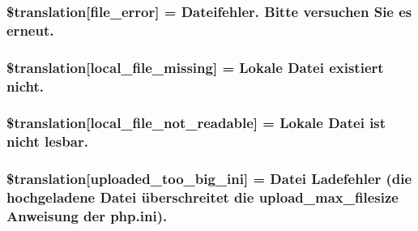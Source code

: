 \subsubsection[{\$translation}]{\setlength{\rightskip}{0pt plus 5cm}\$translation\mbox{[}\textquotesingle{}file\+\_\+error\textquotesingle{}\mbox{]} = \textquotesingle{}Dateifehler. Bitte versuchen Sie es erneut.\textquotesingle{}}\label{class_8upload_8de___d_e_8php_ac7498e49b9771b04698029aa61c70821}
\hypertarget{class_8upload_8de___d_e_8php_a6ec3d3a47ab70d77e7aa593e82ead10e}{}
\subsubsection[{\$translation}]{\setlength{\rightskip}{0pt plus 5cm}\$translation\mbox{[}\textquotesingle{}local\+\_\+file\+\_\+missing\textquotesingle{}\mbox{]} = \textquotesingle{}Lokale Datei existiert nicht.\textquotesingle{}}\label{class_8upload_8de___d_e_8php_a6ec3d3a47ab70d77e7aa593e82ead10e}
\hypertarget{class_8upload_8de___d_e_8php_a60104befef9b241f3a7a6a755618a4b3}{}
\subsubsection[{\$translation}]{\setlength{\rightskip}{0pt plus 5cm}\$translation\mbox{[}\textquotesingle{}local\+\_\+file\+\_\+not\+\_\+readable\textquotesingle{}\mbox{]} = \textquotesingle{}Lokale Datei ist nicht lesbar.\textquotesingle{}}\label{class_8upload_8de___d_e_8php_a60104befef9b241f3a7a6a755618a4b3}
\hypertarget{class_8upload_8de___d_e_8php_a6a08dcd0d3651fdd098568f6b2f0a42c}{}
\subsubsection[{\$translation}]{\setlength{\rightskip}{0pt plus 5cm}\$translation\mbox{[}\textquotesingle{}uploaded\+\_\+too\+\_\+big\+\_\+ini\textquotesingle{}\mbox{]} = \textquotesingle{}Datei Ladefehler (die hochgeladene Datei überschreitet die upload\+\_\+max\+\_\+filesize Anweisung der php.\+ini).\textquotesingle{}}\label{class_8upload_8de___d_e_8php_a6a08dcd0d3651fdd098568f6b2f0a42c}
\hypertarget{class_8upload_8de___d_e_8php_a623d5b8b92169f57d7e43458aa911cbb}{}
